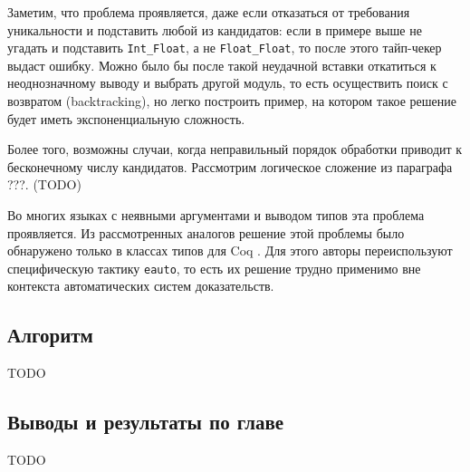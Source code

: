 \documentclass[../diploma.tex]{subfiles}
\begin{document}
Заметим, что проблема проявляется, даже если отказаться от требования уникальности и подставить любой из кандидатов: если в примере выше не угадать и подставить \texttt{Int_Float}, а не \texttt{Float_Float}, то после этого тайп-чекер выдаст ошибку. Можно было бы после такой неудачной вставки откатиться к неоднозначному выводу и выбрать другой модуль, то есть осуществить поиск с возвратом (backtracking), но легко построить пример, на котором такое решение будет иметь экспоненциальную сложность.

Более того, возможны случаи, когда неправильный порядок обработки приводит к бесконечному числу кандидатов. Рассмотрим логическое сложение из параграфа ???. (TODO)

Во многих языках с неявными аргументами и выводом типов эта проблема проявляется. Из рассмотренных аналогов решение этой проблемы было обнаружено только в классах типов для Coq \cite{coq_typeclasses}. Для этого авторы переиспользуют специфическую тактику \texttt{eauto}, то есть их решение трудно применимо вне контекста автоматических систем доказательств.

\subsection{Алгоритм}

TODO

\subsection{Выводы и результаты по главе}

TODO
\end{document}
